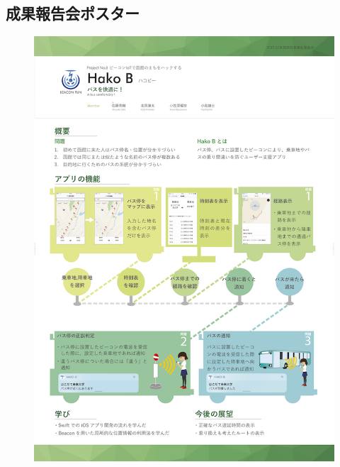 \documentclass[openany,11pt,papersize]{jsbook}
\begin{document}
\begin{appendix}
\chapter{成果報告会ポスター}
\begin{figure}[htbp]
  \begin{center}
    \includegraphics[clip,width=14cm]{img/final_poster.png}
    \label{fig:poster}
  \end{center}
\end{figure}

  \end{appendix}



  \printbibliography[title=参考文献]

  
\end{document}
